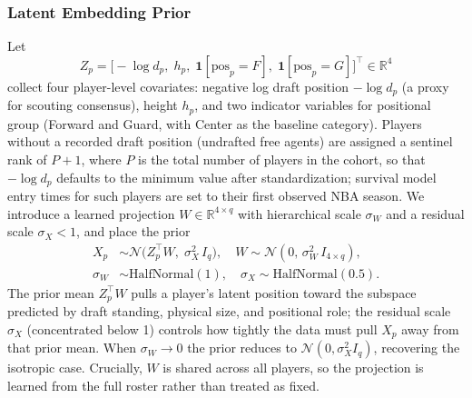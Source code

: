 \subsubsection{Latent Embedding Prior}

Let
\[
  Z_p = \bigl[-\log d_p,\; h_p,\;\mathbf{1}[\mathrm{pos}_p = F],\;\mathbf{1}[\mathrm{pos}_p = G]\bigr]^\top \in \mathbb{R}^4
\]
collect four player-level covariates: negative log draft position $-\log d_p$ (a proxy for scouting consensus), height $h_p$, and two indicator variables for positional group (Forward and Guard, with Center as the baseline category).  Players without a recorded draft position (undrafted free agents) are assigned a sentinel rank of $P{+}1$, where $P$ is the total number of players in the cohort, so that $-\log d_p$ defaults to the minimum value after standardization; survival model entry times for such players are set to their first observed NBA season.  We introduce a learned projection $W \in \mathbb{R}^{4 \times q}$ with hierarchical scale $\sigma_W$ and a residual scale $\sigma_X < 1$, and place the prior
\begin{align}
\label{eq:structured_prior}
  X_p &\sim \mathcal{N}\!\bigl(Z_p^\top W,\; \sigma_X^2\, I_q\bigr), \quad
  W \sim \mathcal{N}(0,\, \sigma_W^2\, I_{4\times q}), \nonumber\\
  \sigma_W &\sim \mathrm{HalfNormal}(1), \quad
  \sigma_X \sim \mathrm{HalfNormal}(0.5).
\end{align}
The prior mean $Z_p^\top W$ pulls a player's latent position toward the subspace predicted by draft standing, physical size, and positional role; the residual scale $\sigma_X$ (concentrated below 1) controls how tightly the data must pull $X_p$ away from that prior mean.  When $\sigma_W \to 0$ the prior reduces to $\mathcal{N}(0, \sigma_X^2 I_q)$, recovering the isotropic case.  Crucially, $W$ is shared across all players, so the projection is learned from the full roster rather than treated as fixed. 

